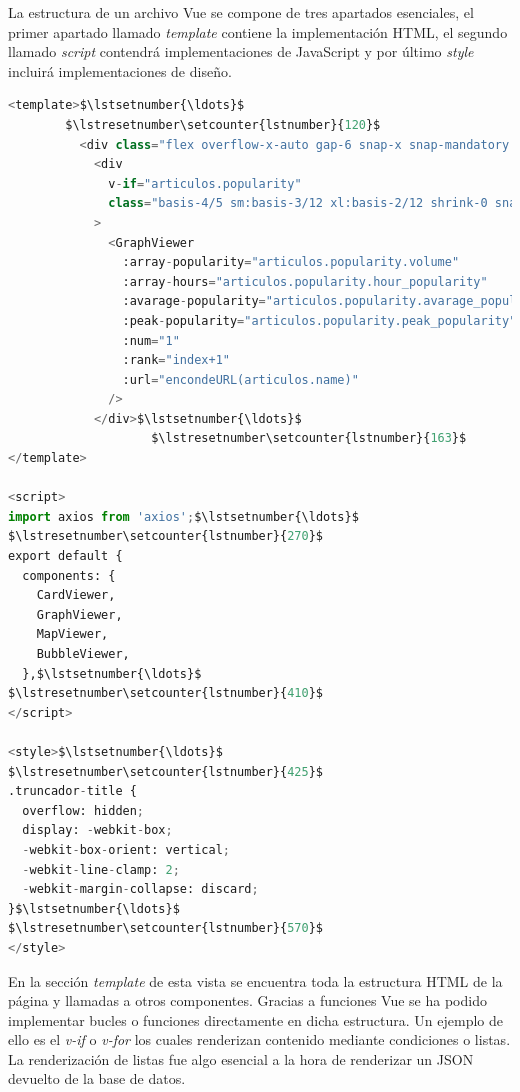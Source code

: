 \vspace{0.3cm}

La estructura de un archivo Vue se compone de tres apartados esenciales, el primer apartado llamado \textit{template} contiene la implementación HTML, el segundo llamado \textit{script} contendrá implementaciones de JavaScript y por último \textit{style} incluirá implementaciones de diseño.

\vspace{0.3cm}

\begin{lstlisting}[caption=Secciones de Vue,language=Python, mathescape=true]
<template>$\lstsetnumber{\ldots}$
        $\lstresetnumber\setcounter{lstnumber}{120}$
          <div class="flex overflow-x-auto gap-6 snap-x snap-mandatory sm:snap-normal before:shrink-0 before:w-[20%] sm:before:w-[0%] after:shrink-0 after:w-[20%] sm:after:w-[0%] sm:horizontal sm:pb-14 pb-5">
            <div
              v-if="articulos.popularity"
              class="basis-4/5 sm:basis-3/12 xl:basis-2/12 shrink-0 snap-center sm:snap-align-none shadowdrop"
            >
              <GraphViewer
                :array-popularity="articulos.popularity.volume"
                :array-hours="articulos.popularity.hour_popularity"
                :avarage-popularity="articulos.popularity.avarage_popularity"
                :peak-popularity="articulos.popularity.peak_popularity"
                :num="1"
                :rank="index+1"
                :url="encondeURL(articulos.name)"
              />
            </div>$\lstsetnumber{\ldots}$
                    $\lstresetnumber\setcounter{lstnumber}{163}$
</template>

<script>
import axios from 'axios';$\lstsetnumber{\ldots}$
$\lstresetnumber\setcounter{lstnumber}{270}$
export default {
  components: {
    CardViewer,
    GraphViewer,
    MapViewer,
    BubbleViewer,
  },$\lstsetnumber{\ldots}$
$\lstresetnumber\setcounter{lstnumber}{410}$
</script>

<style>$\lstsetnumber{\ldots}$
$\lstresetnumber\setcounter{lstnumber}{425}$
.truncador-title {
  overflow: hidden;
  display: -webkit-box;
  -webkit-box-orient: vertical;
  -webkit-line-clamp: 2;
  -webkit-margin-collapse: discard;
}$\lstsetnumber{\ldots}$
$\lstresetnumber\setcounter{lstnumber}{570}$
</style>

\end{lstlisting}

En la sección \textit{template} de esta vista se encuentra toda la estructura HTML de la página y llamadas a otros componentes. Gracias a funciones Vue se ha podido implementar bucles o funciones directamente en dicha estructura. Un ejemplo de ello es el \textit{v-if} o \textit{v-for} los cuales renderizan contenido mediante condiciones o listas. La renderización de listas fue algo esencial a la hora de renderizar un \ac{JSON} devuelto de la base de datos.

